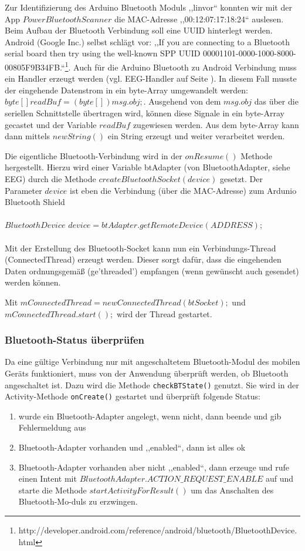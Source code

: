 	Zur Identifizierung des Arduino Bluetooth Moduls ,,linvor`` konnten wir mit der App $Power Bluetooth Scanner$ die MAC-Adresse ,,00:12:07:17:18:24`` auslesen. 
	Beim Aufbau der Bluetooth Verbindung soll eine UUID hinterlegt werden. Android (Google Inc.) selbst schlägt vor: ,,If you are connecting to a Bluetooth serial board then try using the well-known SPP UUID 00001101-0000-1000-8000-00805F9B34FB.``\footnote{http://developer.android.com/reference/android/bluetooth/BluetoothDevice.html}. 
	Auch für die Arduino Bluetooth zu Android Verbindung muss ein Handler erzeugt werden (vgl. EEG-Handler auf Seite \pageref{handler}).
	In diesem Fall musste der eingehende Datenstrom in ein byte-Array umgewandelt werden: $byte[] readBuf = (byte[]) msg.obj;$. Ausgehend von dem $msg.obj$ das über die seriellen Schnittstelle übertragen wird, können diese Signale in ein byte-Array gecastet und der Variable $readBuf$ zugewiesen werden. Aus dem byte-Array kann dann mittels $new String()$ ein String erzeugt und weiter verarbeitet werden.
	
	Die eigentliche Bluetooth-Verbindung wird in der $onResume()$ Methode hergestellt. Hierzu wird einer Variable btAdapter (von BluetoothAdapter, siehe EEG) durch die Methode $create BluetoothSocket(device)$ gesetzt. 
	Der Parameter $device$ ist eben die Verbindung (über die MAC-Adresse) zum Ardunio Bluetooth Shield \\ \\
	$BluetoothDevice$ $device = btAdapter.getRemoteDevice(ADDRESS);$\\ \\
	Mit der Erstellung des Bluetooth-Socket kann nun ein Verbindungs-Thread (ConnectedThread) erzeugt werden. Dieser sorgt dafür, dass die eingehenden Daten ordnungsgemäß (ge'threaded') empfangen (wenn gewünscht auch gesendet) werden können. 
	
	Mit $mConnectedThread = new ConnectedThread(btSocket);$ und \\$mConnectedThread.start();$ wird der Thread gestartet.
	
	\subsubsection*{Bluetooth-Status überprüfen}
	
	Da eine gültige Verbindung nur mit angeschaltetem Bluetooth-Modul des mobilen Geräts funktioniert, muss von der Anwendung überprüft werden, ob Bluetooth angeschaltet ist. Dazu wird die Methode \texttt{checkBTState()} genutzt. Sie wird in der Activity-Methode \texttt{onCreate()} gestartet und überprüft folgende Status:
	\begin{enumerate}
	\item wurde ein Bluetooth-Adapter angelegt, wenn nicht, dann beende und gib Fehlermeldung aus
	\item Bluetooth-Adapter vorhanden und ,,enabled``, dann ist alles ok
	\item Bluetooth-Adapter vorhanden aber nicht ,,enabled``, dann erzeuge und rufe einen Intent mit $BluetoothAdapter.ACTION\_REQUEST\_ENABLE$ auf und starte die Methode $startActivityForResult()$ um das Anschalten des Bluetooth-Mo-duls zu erzwingen.
	\end{enumerate}
		
